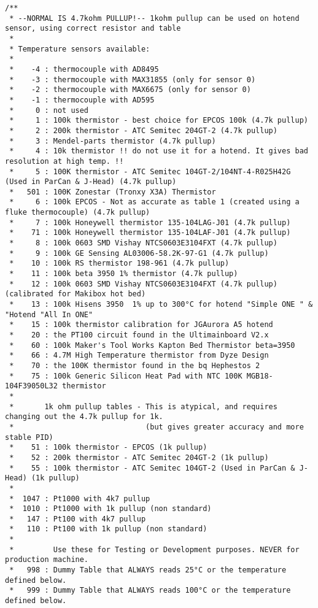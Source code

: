 \begin{lstlisting}
/**
 * --NORMAL IS 4.7kohm PULLUP!-- 1kohm pullup can be used on hotend sensor, using correct resistor and table
 *
 * Temperature sensors available:
 *
 *    -4 : thermocouple with AD8495
 *    -3 : thermocouple with MAX31855 (only for sensor 0)
 *    -2 : thermocouple with MAX6675 (only for sensor 0)
 *    -1 : thermocouple with AD595
 *     0 : not used
 *     1 : 100k thermistor - best choice for EPCOS 100k (4.7k pullup)
 *     2 : 200k thermistor - ATC Semitec 204GT-2 (4.7k pullup)
 *     3 : Mendel-parts thermistor (4.7k pullup)
 *     4 : 10k thermistor !! do not use it for a hotend. It gives bad resolution at high temp. !!
 *     5 : 100K thermistor - ATC Semitec 104GT-2/104NT-4-R025H42G (Used in ParCan & J-Head) (4.7k pullup)
 *   501 : 100K Zonestar (Tronxy X3A) Thermistor
 *     6 : 100k EPCOS - Not as accurate as table 1 (created using a fluke thermocouple) (4.7k pullup)
 *     7 : 100k Honeywell thermistor 135-104LAG-J01 (4.7k pullup)
 *    71 : 100k Honeywell thermistor 135-104LAF-J01 (4.7k pullup)
 *     8 : 100k 0603 SMD Vishay NTCS0603E3104FXT (4.7k pullup)
 *     9 : 100k GE Sensing AL03006-58.2K-97-G1 (4.7k pullup)
 *    10 : 100k RS thermistor 198-961 (4.7k pullup)
 *    11 : 100k beta 3950 1% thermistor (4.7k pullup)
 *    12 : 100k 0603 SMD Vishay NTCS0603E3104FXT (4.7k pullup) (calibrated for Makibox hot bed)
 *    13 : 100k Hisens 3950  1% up to 300°C for hotend "Simple ONE " & "Hotend "All In ONE"
 *    15 : 100k thermistor calibration for JGAurora A5 hotend
 *    20 : the PT100 circuit found in the Ultimainboard V2.x
 *    60 : 100k Maker's Tool Works Kapton Bed Thermistor beta=3950
 *    66 : 4.7M High Temperature thermistor from Dyze Design
 *    70 : the 100K thermistor found in the bq Hephestos 2
 *    75 : 100k Generic Silicon Heat Pad with NTC 100K MGB18-104F39050L32 thermistor
 *
 *       1k ohm pullup tables - This is atypical, and requires changing out the 4.7k pullup for 1k.
 *                              (but gives greater accuracy and more stable PID)
 *    51 : 100k thermistor - EPCOS (1k pullup)
 *    52 : 200k thermistor - ATC Semitec 204GT-2 (1k pullup)
 *    55 : 100k thermistor - ATC Semitec 104GT-2 (Used in ParCan & J-Head) (1k pullup)
 *
 *  1047 : Pt1000 with 4k7 pullup
 *  1010 : Pt1000 with 1k pullup (non standard)
 *   147 : Pt100 with 4k7 pullup
 *   110 : Pt100 with 1k pullup (non standard)
 *
 *         Use these for Testing or Development purposes. NEVER for production machine.
 *   998 : Dummy Table that ALWAYS reads 25°C or the temperature defined below.
 *   999 : Dummy Table that ALWAYS reads 100°C or the temperature defined below.

\end{lstlisting}
